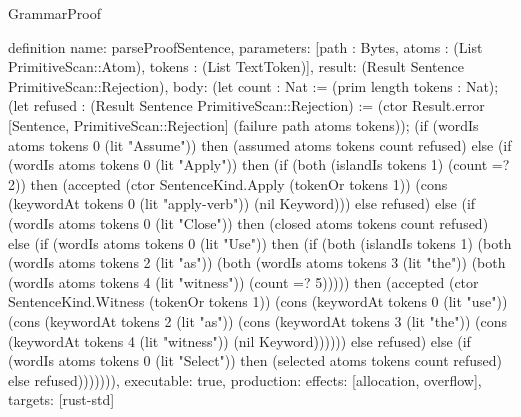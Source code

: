 \begin{lexlean}{GrammarProof}
\begin{semanticmodule}
definition{
  name: parseProofSentence,
  parameters: [path : Bytes, atoms : (List PrimitiveScan::Atom), tokens : (List TextToken)],
  result: (Result Sentence PrimitiveScan::Rejection),
  body: (let count : Nat := (prim length tokens : Nat); (let refused : (Result Sentence PrimitiveScan::Rejection) := (ctor Result.error [Sentence, PrimitiveScan::Rejection] (failure path atoms tokens)); (if (wordIs atoms tokens 0 (lit "Assume")) then (assumed atoms tokens count refused) else (if (wordIs atoms tokens 0 (lit "Apply")) then (if (both (islandIs tokens 1) (count =? 2)) then (accepted (ctor SentenceKind.Apply (tokenOr tokens 1)) (cons (keywordAt tokens 0 (lit "apply-verb")) (nil Keyword))) else refused) else (if (wordIs atoms tokens 0 (lit "Close")) then (closed atoms tokens count refused) else (if (wordIs atoms tokens 0 (lit "Use")) then (if (both (islandIs tokens 1) (both (wordIs atoms tokens 2 (lit "as")) (both (wordIs atoms tokens 3 (lit "the")) (both (wordIs atoms tokens 4 (lit "witness")) (count =? 5))))) then (accepted (ctor SentenceKind.Witness (tokenOr tokens 1)) (cons (keywordAt tokens 0 (lit "use")) (cons (keywordAt tokens 2 (lit "as")) (cons (keywordAt tokens 3 (lit "the")) (cons (keywordAt tokens 4 (lit "witness")) (nil Keyword)))))) else refused) else (if (wordIs atoms tokens 0 (lit "Select")) then (selected atoms tokens count refused) else refused))))))),
  executable: true,
  production: {effects: [allocation, overflow], targets: [rust-std]}
}
\end{semanticmodule}
\end{lexlean}
